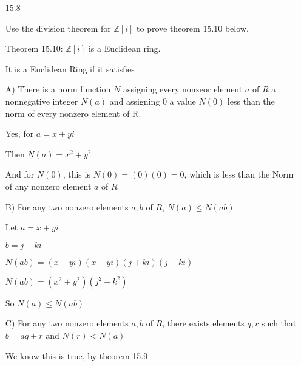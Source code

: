 \documentclass[12pt]{article}
\begin{document}
\begin{itemize}
\begin{comment}
	\end{comment}

\newpage 
\item[15.8]

	Use the division theorem for $\mathbb{Z}[i]$ to prove theorem 15.10 below.

	Theorem 15.10: $\mathbb{Z}[i]$ is a Euclidean ring.

	It is a Euclidean Ring if it satisfies 

	A) There is a norm function $N$ assigning every nonzeor element $a$ of $R$ a nonnegative integer $N(a)$ and assigning 0 a value $N(0)$ less than the norm of every nonzero element of R.

	Yes, for $a = x + yi$

	Then $N(a) = x^2 + y^2$

	And for $N(0)$, this is $N(0) = (0)(0) = 0$, which is less than the Norm of any nonzero element $a$ of $R$

	B) For any two nonzero elements $a,b$ of $R$, $N(a) \leq N(ab)$

	Let $a = x + yi$

	$b = j + ki$

	$N(ab) = (x+yi)(x-yi)(j+ki)(j-ki)$

	$N(ab) = (x^2+y^2)(j^2 + k^2)$

	So $N(a) \leq N(ab)$

	C) For any two nonzero elements $a, b$ of $R$, there exists elements $q,r$ such that $b = aq + r$ and $N(r) < N(a)$

	We know this is true, by theorem 15.9

\end{itemize}
\end{document}
